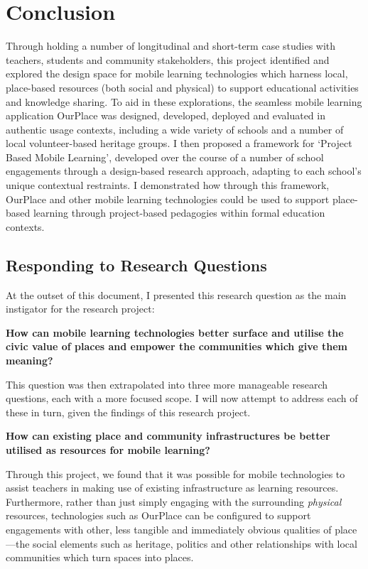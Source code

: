 \section{Conclusion}

Through holding a number of longitudinal and short-term case studies with teachers, students and community stakeholders, this project identified and explored the design space for mobile learning technologies which harness local, place-based resources (both social and physical) to support educational activities and knowledge sharing. To aid in these explorations, the seamless mobile learning application OurPlace was designed, developed, deployed and evaluated in authentic usage contexts, including a wide variety of schools and a number of local volunteer-based heritage groups. I then proposed a framework for `Project Based Mobile Learning', developed over the course of a number of school engagements through a design-based research approach, adapting to each school's unique contextual restraints. I demonstrated how through this framework, OurPlace and other mobile learning technologies could be used to support place-based learning through project-based pedagogies within formal education contexts.

\subsection{Responding to Research Questions}
\label{sec:RespondingtoQuestions}

At the outset of this document, I presented this research question as the main instigator for the research project:

\begin{displayquote}
\textbf{How can mobile learning technologies better surface and utilise the civic value of places and empower the communities which give them meaning?}
\end{displayquote}

This question was then extrapolated into three more manageable research questions, each with a more focused scope. I will now attempt to address each of these in turn, given the findings of this research project.

\begin{displayquote}
\textbf{How can existing place and community infrastructures be better utilised as resources for mobile learning?}
\end{displayquote}

Through this project, we found that it was possible for mobile technologies to assist teachers in making use of existing infrastructure as learning resources. Furthermore, rather than just simply engaging with the surrounding \textit{physical} resources, technologies such as OurPlace can be configured to support engagements with other, less tangible and immediately obvious qualities of place---the social elements such as heritage, politics and other relationships with local communities which turn spaces into places. 

